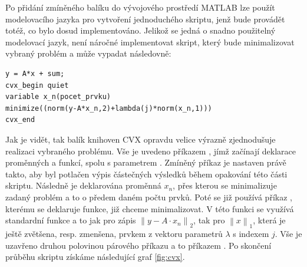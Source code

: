 \documentclass[FM,BP]{tulthesis}
\begin{document}
Po přidání zmíněného balíku do vývojového prostředí MATLAB lze použít modelovacího jazyka pro vytvoření jednoduchého skriptu, jenž bude provádět totéž, co bylo dosud implementováno. Jelikož se jedná o snadno použitelný modelovací jazyk, není náročné implementovat skript, který bude minimalizovat vybraný problém a může vypadat následovně: 

\newpage

\begin{lstlisting}
y = A*x + sum;
cvx_begin quiet
variable x_n(pocet_prvku)
minimize((norm(y-A*x_n,2)+lambda(j)*norm(x_n,1)))
cvx_end
\end{lstlisting}

Jak je vidět, tak balík knihoven CVX opravdu velice výrazně zjednodušuje realizaci vybraného problému. Vše je uvedeno příkazem , jímž začínají deklarace proměnných a funkcí, spolu s parametrem . Zmíněný příkaz je nastaven právě takto, aby byl potlačen výpis částečných výsledků během opakování této části skriptu. Následně je deklarována proměnná $x_n$, přes kterou se minimalizuje zadaný problém a to o předem daném počtu prvků. Poté se již používá příkaz , kterému se deklaruje funkce, již chceme minimalizovat. V této funkci se využívá standardní funkce  a to jak pro zápis $\left\| y - A \cdot x_n\right\|_2$, tak pro $ \left\| x \right\|_1  $, která je ještě zvětšena, resp. zmenšena, prvkem z vektoru parametrů $\lambda$ s indexem $j$. Vše je uzavřeno druhou polovinou párového příkazu a to příkazem . Po skončení průběhu skriptu získáme následující graf \ref{fig:cvx}.
\end{document}
